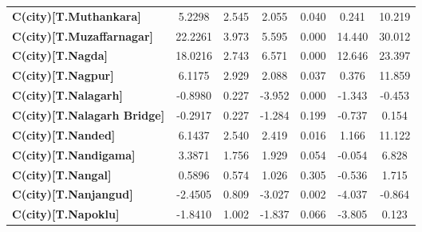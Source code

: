 \begin{center}
\begin{tabular}{lcccccc}
\textbf{C(city)[T.Muthankara]}                                                                      &       5.2298  &        2.545     &     2.055  &         0.040        &        0.241    &       10.219     \\
\textbf{C(city)[T.Muzaffarnagar]}                                                                   &      22.2261  &        3.973     &     5.595  &         0.000        &       14.440    &       30.012     \\
\textbf{C(city)[T.Nagda]}                                                                           &      18.0216  &        2.743     &     6.571  &         0.000        &       12.646    &       23.397     \\
\textbf{C(city)[T.Nagpur]}                                                                          &       6.1175  &        2.929     &     2.088  &         0.037        &        0.376    &       11.859     \\
\textbf{C(city)[T.Nalagarh]}                                                                        &      -0.8980  &        0.227     &    -3.952  &         0.000        &       -1.343    &       -0.453     \\
\textbf{C(city)[T.Nalagarh Bridge]}                                                                 &      -0.2917  &        0.227     &    -1.284  &         0.199        &       -0.737    &        0.154     \\
\textbf{C(city)[T.Nanded]}                                                                          &       6.1437  &        2.540     &     2.419  &         0.016        &        1.166    &       11.122     \\
\textbf{C(city)[T.Nandigama]}                                                                       &       3.3871  &        1.756     &     1.929  &         0.054        &       -0.054    &        6.828     \\
\textbf{C(city)[T.Nangal]}                                                                          &       0.5896  &        0.574     &     1.026  &         0.305        &       -0.536    &        1.715     \\
\textbf{C(city)[T.Nanjangud]}                                                                       &      -2.4505  &        0.809     &    -3.027  &         0.002        &       -4.037    &       -0.864     \\
\textbf{C(city)[T.Napoklu]}                                                                         &      -1.8410  &        1.002     &    -1.837  &         0.066        &       -3.805    &        0.123     \\

\end{tabular}
\end{center}

